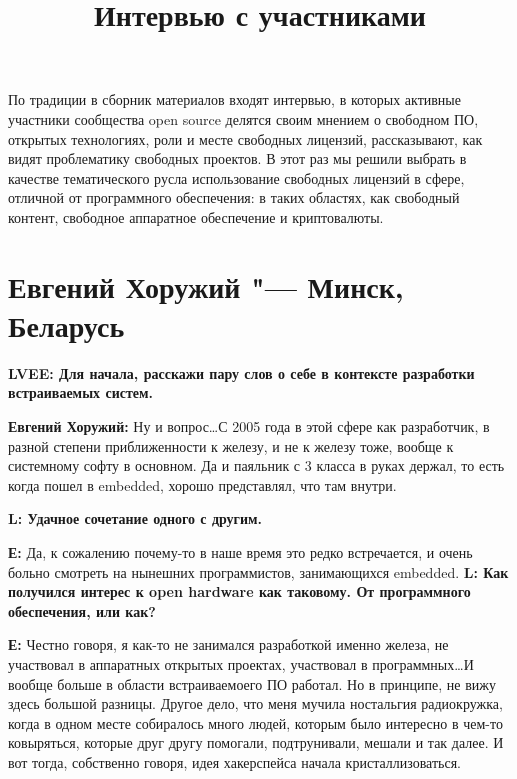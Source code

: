 \documentclass[10pt, a5paper]{article}
\begin{document}
\title{Интервью с участниками}
\date{}
\maketitle

По традиции в сборник материалов входят интервью, в которых активные участники
сообщества open source делятся своим мнением о свободном ПО, открытых
технологиях, роли и месте свободных лицензий, рассказывают, как видят проблематику
свободных проектов. В этот раз мы решили выбрать в качестве тематического русла
использование свободных лицензий в сфере, отличной от программного обеспечения:
в таких областях, как свободный контент, свободное аппаратное обеспечение и криптовалюты.

\section{Евгений Хоружий "---  Минск, Беларусь}

{\noindent \bf LVEE: Для начала, расскажи пару слов о себе в контексте разработки встраиваемых систем.}

{\noindent \bf Евгений Хоружий:} Ну и вопрос\ldots С 2005 года в этой сфере как разработчик, в разной степени приближенности к железу, и не к железу тоже, вообще к системному софту в основном. Да и паяльник с 3 класса в руках держал, то есть когда пошел в embedded, хорошо представлял, что там внутри.

{\noindent \bf L: Удачное сочетание одного с другим.}

{\noindent \bf Е:} Да, к сожалению почему-то в наше время это редко встречается, и очень больно смотреть на нынешних программистов, занимающихся embedded.
{\noindent \bf L: Как получился интерес к open hardware как таковому. От программного обеспечения, или как?} 

{\noindent \bf Е:}  Честно говоря, я как-то не занимался разработкой именно железа, не участвовал в аппаратных открытых проектах, участвовал в программных\ldots И вообще больше в области встраиваемоего ПО работал. Но в принципе, не вижу здесь большой разницы. Другое дело, что меня мучила ностальгия радиокружка, когда в одном месте собиралось много людей, которым было интересно в чем-то ковыряться, которые друг другу помогали, подтрунивали, мешали и так далее. И вот тогда, собственно говоря, идея хакерспейса начала кристаллизоваться. 
\end{document}
